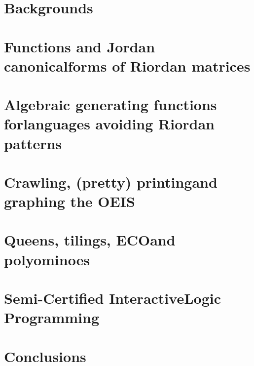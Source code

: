 \documentclass[a4paper]{tufte-book}
\begin{document}
\cleardoublepage

\chapter{Backgrounds}
\label{ch:backgrounds}



\chapter{Functions and Jordan canonical\newline forms of Riordan matrices}
\label{ch:Riordan-matrices-function}



\chapter{Algebraic generating functions for\newline languages avoiding Riordan patterns}
\label{ch:algebraic-gfs-languages-avoiding-Riordan-patterns}



\chapter{Crawling, (pretty) printing\newline and graphing the OEIS}
\label{ch:OEIS:tools}



\chapter{Queens, tilings, ECO\newline and polyominoes}
\label{ch:queens-tilings-polyominoes}



\chapter{Semi-Certified Interactive\newline Logic Programming}
\label{ch:scilp}



\chapter*{Conclusions}




\end{document}
